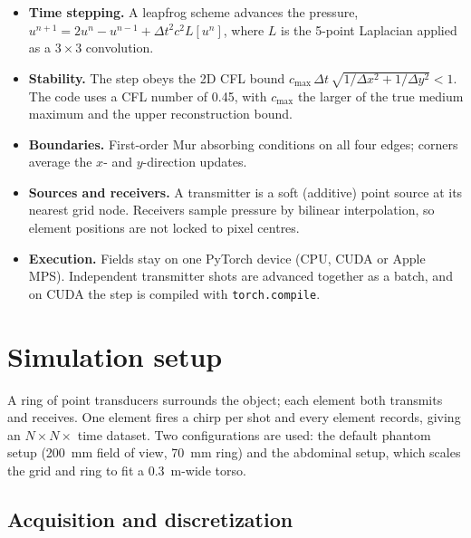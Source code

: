 \documentclass[11pt]{article}
\newcommand{\code}[1]{\texttt{#1}}
\begin{document}
\begin{itemize}
  \item \textbf{Time stepping.} A leapfrog scheme advances the pressure,
    $u^{n+1} = 2u^n - u^{n-1} + \Delta t^2 c^2 L[u^n]$, where $L$ is the
    5-point Laplacian applied as a $3\times3$ convolution.
  \item \textbf{Stability.} The step obeys the 2D CFL bound
    $c_{\max}\,\Delta t\,\sqrt{1/\Delta x^2 + 1/\Delta y^2} < 1$. The code uses a
    CFL number of 0.45, with $c_{\max}$ the larger of the true medium maximum
    and the upper reconstruction bound.
  \item \textbf{Boundaries.} First-order Mur absorbing conditions on all four
    edges; corners average the $x$- and $y$-direction updates.
  \item \textbf{Sources and receivers.} A transmitter is a soft (additive) point
    source at its nearest grid node. Receivers sample pressure by bilinear
    interpolation, so element positions are not locked to pixel centres.
  \item \textbf{Execution.} Fields stay on one PyTorch device (CPU, CUDA or
    Apple MPS). Independent transmitter shots are advanced together as a batch,
    and on CUDA the step is compiled with \code{torch.compile}.
\end{itemize}

\section{Simulation setup}
\label{sec:setup}

A ring of point transducers surrounds the object; each element both transmits
and receives. One element fires a chirp per shot and every element records,
giving an $N \times N \times$ time dataset. Two configurations are used: the
default phantom setup (200~mm field of view, 70~mm ring) and the abdominal
setup, which scales the grid and ring to fit a 0.3~m-wide torso.

\subsection{Acquisition and discretization}
\end{document}
